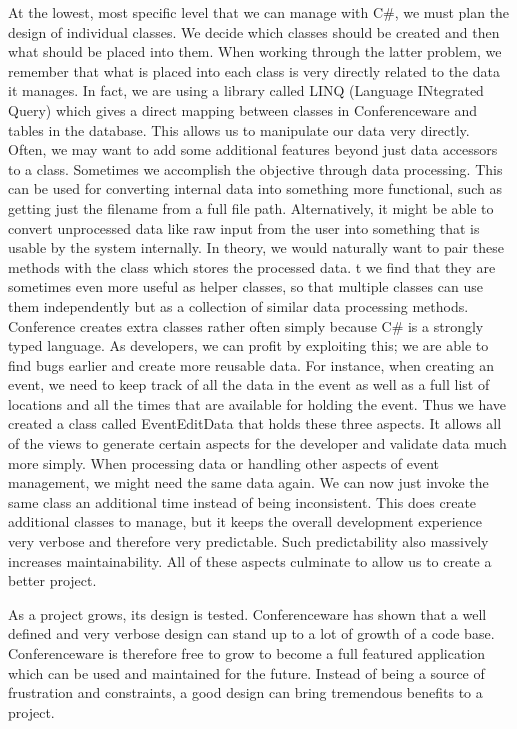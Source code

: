 \documentclass[12pt]{article}
\begin{document}
At the lowest, most specific level that we can manage with C\#, we must plan the design of individual classes. We decide which classes should be created and then what should be placed into them. When working through the latter problem, we remember that what is placed into each class is very directly related to the data it manages. In fact, we are using a library called LINQ (Language INtegrated Query) which gives a direct mapping between classes in Conferenceware and tables in the database. This allows us to manipulate our data very directly. Often, we may want to add some additional features beyond just data accessors to a class.  Sometimes we accomplish the objective through data processing. This can be used for converting internal data into something more functional, such as getting just the filename from a full file path. Alternatively, it might be able to convert unprocessed data like raw input from the user into something that is usable by the system internally.  In theory, we would naturally want to pair these methods with the class which stores the processed data.  t we find that they are sometimes even more useful as helper classes, so that multiple classes can use them independently but as a collection of similar data processing methods. Conference creates extra classes rather often simply because C\# is a strongly typed language. As developers, we can profit by exploiting this; we are able to find bugs earlier and create more reusable data.  For instance, when creating an event, we need to keep track of all the data in the event as well as a full list of locations and all the times that are available for holding the event. Thus we have created a class called EventEditData that holds these three aspects. It allows all of the views to generate certain aspects for the developer and validate data much more simply. When processing data or handling other aspects of event management, we might need the same data again. We can now just invoke the same class an additional time instead of being inconsistent. This does create additional classes to manage, but it keeps the overall development experience very verbose and therefore very predictable. Such predictability also massively increases maintainability. All of these aspects culminate to allow us to create a better project.

As a project grows, its design is tested. Conferenceware has shown that a well defined and very verbose design can stand up to a lot of growth of a code base. Conferenceware is therefore free to grow to become a full featured application which can be used and maintained for the future. Instead of being a source of frustration and constraints, a good design can bring tremendous benefits to a project.
\end{document}
